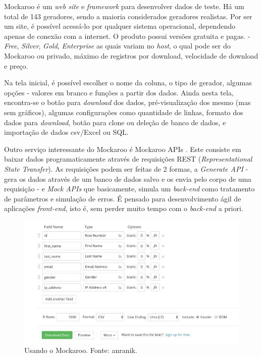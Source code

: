 \documentclass[
	12pt,				%
	openright,			%
	twoside,			%
	a4paper,			%
	english,			%
	brazil				%
	]{abntex2}
\begin{document}
			Mockaroo \cite{mockaroo} é um \emph{web site} e \emph{framework} para desenvolver dados de teste.
			Há um total de 143 geradores, sendo a maioria considerados geradores realistas.
			Por ser um site, é possível acessá-lo por qualquer sistema operacional, dependendo apenas de conexão com a internet.
			O produto possui versões gratuita e pagas. - \emph{Free}, \emph{Silver}, \emph{Gold}, \emph{Enterprise} as quais variam no \emph{host}, o qual pode ser do Mockaroo ou privado, máximo de registros por download, velocidade de download e preço.
			\par
			Na tela inicial, é possível escolher o nome da coluna, o tipo de gerador, algumas opções - valores em branco e funções a partir dos dados.
			Ainda nesta tela, encontra-se o botão para \emph{download} dos dados, pré-visualização dos mesmo (mas sem gráficos), algumas configurações como quantidade de linhas, formato dos dados para \emph{download}, botão para clone ou deleção de banco de dados, e importação de dados csv/Excel ou SQL.
			\par
			Outro serviço interessante do Mockaroo é Mockaroo APIs \cite{mockarooAPI}.
			Este consiste em baixar dados programaticamente através de requisições REST (\emph{Representational State Transfer}).
			As requisições podem ser feitas de 2 formas, a \emph{Generate API} - gera os dados através de um banco de dados salvo e os envia pelo corpo de uma requisição - 
			e \emph{Mock APIs} que basicamente, simula um \emph{back-end} como tratamento de parâmetros e simulação de erros. 
			É pensado para desenvolvimento ágil de aplicações \emph{front-end}, isto é, sem perder muito tempo com o \emph{back-end} a priori.
			\begin{figure}[h]
				\centering
				\includegraphics[width=\linewidth]{./figures/TrabalhosRelacionados/mockaroo.jpg}
				\caption{Usando o Mockaroo. Fonte: anranik.}
				\label{fig:mockaroo}
			\end{figure}
\end{document}
